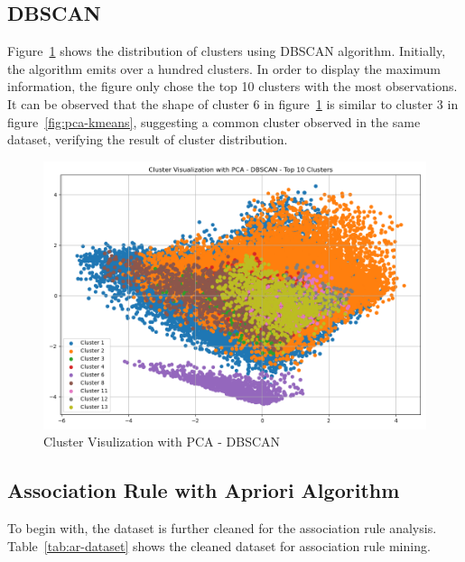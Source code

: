 \subsection{DBSCAN}

Figure~\ref{fig:pca-dbscan} shows the distribution of clusters using DBSCAN algorithm. Initially, the algorithm emits over a hundred clusters. In order to display the maximum information, the figure only chose the top 10 clusters with the most observations. It can be observed that the shape of cluster 6 in figure~\ref{fig:pca-dbscan} is similar to cluster 3 in figure~\ref{fig:pca-kmeans}, suggesting a common cluster observed in the same dataset, verifying the result of cluster distribution.

\begin{figure}
    \centering
    \includegraphics[width=1\linewidth]{docs//assets/Cluster Visualization with PCA - DBSCAN - Top 10 Clusters.png}
    \caption{Cluster Visulization with PCA - DBSCAN}
    \label{fig:pca-dbscan}
\end{figure}


\subsection{Association Rule with Apriori Algorithm}




To begin with, the dataset is further cleaned for the association rule analysis. Table~\ref{tab:ar-dataset} shows the cleaned dataset for association rule mining.

